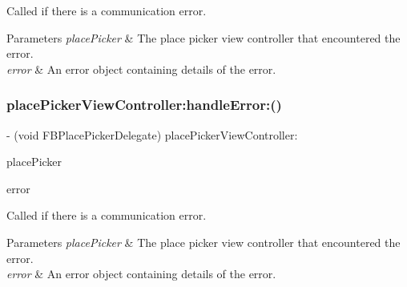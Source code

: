 Called if there is a communication error.


\begin{DoxyParams}{Parameters}
{\em place\+Picker} & The place picker view controller that encountered the error. \\
\hline
{\em error} & An error object containing details of the error. \\
\hline
\end{DoxyParams}
\mbox{\label{protocolFBPlacePickerDelegate_01-p_a5a050442be2188ad3b2b04aa977577a4}} 
\subsubsection{\texorpdfstring{place\+Picker\+View\+Controller\+:handle\+Error\+:()}{placePickerViewController:handleError:()}\hspace{0.1cm}{\footnotesize\ttfamily [3/5]}}
{\footnotesize\ttfamily -\/ (void F\+B\+Place\+Picker\+Delegate) place\+Picker\+View\+Controller\+: \begin{DoxyParamCaption}\item[{(\hyperlink{interfaceFBPlacePickerViewController}{F\+B\+Place\+Picker\+View\+Controller} $\ast$)}]{place\+Picker }\item[{handleError:(N\+S\+Error $\ast$)}]{error }\end{DoxyParamCaption}\hspace{0.3cm}{\ttfamily [optional]}}

Called if there is a communication error.


\begin{DoxyParams}{Parameters}
{\em place\+Picker} & The place picker view controller that encountered the error. \\
\hline
{\em error} & An error object containing details of the error. \\
\hline
\end{DoxyParams}
\mbox{\label{protocolFBPlacePickerDelegate_01-p_a5a050442be2188ad3b2b04aa977577a4}} 
